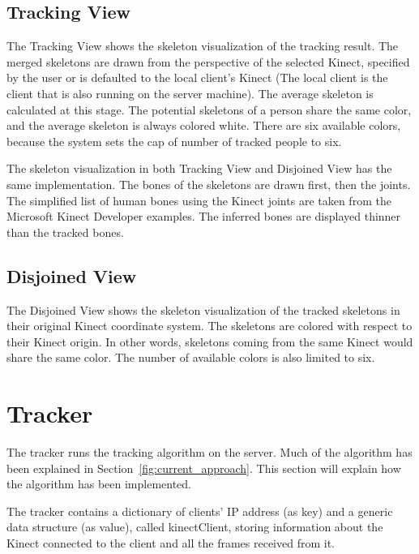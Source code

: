 \subsection{Tracking View}
\label{sec:implementation_tracking_view}

The Tracking View shows the skeleton visualization of the tracking result. The merged skeletons are drawn from the perspective of the selected Kinect, specified by the user or is defaulted to the local client's Kinect (The local client is the client that is also running on the server machine). The average skeleton is calculated at this stage. The potential skeletons of a person share the same color, and the average skeleton is always colored white. There are six available colors, because the system sets the cap of number of tracked people to six.

The skeleton visualization in both Tracking View and Disjoined View has the same implementation. The bones of the skeletons are drawn first, then the joints. The simplified list of human bones using the Kinect joints are taken from the Microsoft Kinect Developer examples. The inferred bones are displayed thinner than the tracked bones.

\subsection{Disjoined View}
\label{sec:implementation_disjoined_view}

The Disjoined View shows the skeleton visualization of the tracked skeletons in their original Kinect coordinate system. The skeletons are colored with respect to their Kinect origin. In other words, skeletons coming from the same Kinect would share the same color. The number of available colors is also limited to six.

\section{Tracker}
\label{sec:implementation_tracker}

The tracker runs the tracking algorithm on the server. Much of the algorithm has been explained in Section~\ref{fig:current_approach}. This section will explain how the algorithm has been implemented.

The tracker contains a dictionary of clients' IP address (as key) and a generic data structure (as value), called kinectClient, storing information about the Kinect connected to the client and all the frames received from it.


